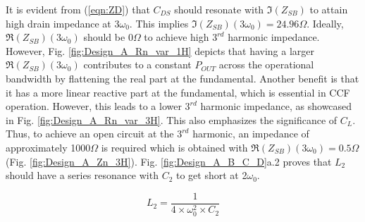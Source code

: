 \documentclass[conference]{IEEEtran}
\begin{document}
It is evident from (\ref{eqn:ZD}) that $C_{DS}$ should resonate with $\Im(Z_{SB})$ to attain high drain impedance at $3\omega_0$. This implies $\Im(Z_{SB})(3\omega_0) = 24.96\Omega$. Ideally, $\Re(Z_{SB})(3\omega_0)$ should be $0\Omega$ to achieve high $3^{rd}$ harmonic impedance. However, Fig. \ref{fig:Design_A_Rn_var_1H} depicts that having a larger $\Re(Z_{SB})(3\omega_0)$ contributes to a constant $P_{OUT}$ across the operational bandwidth by flattening the real part at the fundamental. Another benefit is that it has a  more linear reactive part at the fundamental, which is essential in CCF operation.
However, this leads to a lower $3^{rd}$ harmonic impedance, as showcased in Fig. \ref{fig:Design_A_Rn_var_3H}. This also emphasizes  the significance of $C_L$. Thus, to achieve an open circuit at the $3^{rd}$ harmonic, an impedance of approximately 1000$\Omega$ is required which is obtained with  $\Re(Z_{SB})(3\omega_0) = 0.5\Omega$ (Fig. \ref{fig:Design_A_Zn_3H}). Fig. \ref{fig:Design_A_B_C_D}a.2 proves that $L_2$ should have a series resonance with $C_2$ to get short at 2$\omega_0$.

\vspace{-0.25in}
\begin{equation}
    L_2=\frac{1}{4\times\omega_0^2\times C_2}%
    \label{eqn:Design_A_2H}
\end{equation}
\end{document}
